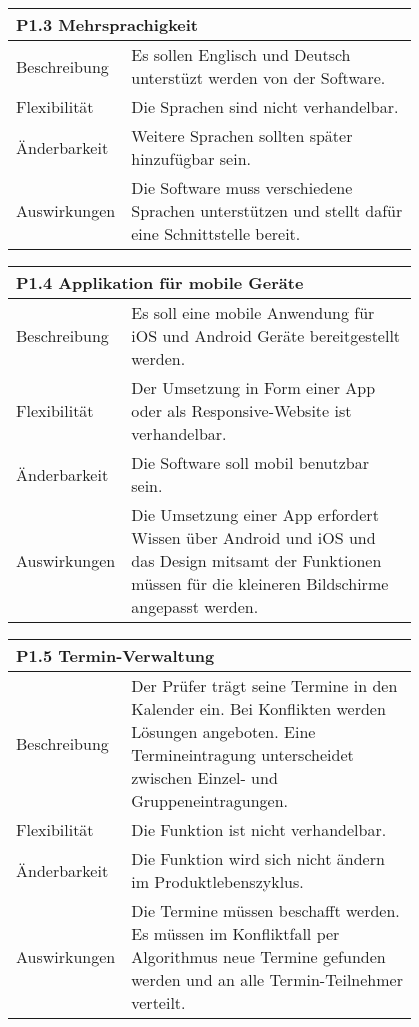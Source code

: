 {\centering
\begin{tabular}{|l|p{0.8\linewidth}|}
\hline
\multicolumn{2}{|l|}{\textbf{P1.3 Mehrsprachigkeit}}
  \tabularnewline \hline
Beschreibung                                               &  Es sollen Englisch und Deutsch unterstüzt werden von der Software. \tabularnewline \hline
Flexibilität                                              & Die Sprachen sind nicht verhandelbar.                                                                                \tabularnewline \hline
Änderbarkeit                                         & Weitere Sprachen sollten später hinzufügbar sein.                                                                 \tabularnewline \hline
Auswirkungen                                                & Die Software muss verschiedene Sprachen unterstützen und stellt dafür eine Schnittstelle bereit.                                         \tabularnewline \hline
 \hline
\end{tabular}



\centering
\begin{tabular}{|l|p{0.8\linewidth}|}
\hline
\multicolumn{2}{|l|}{\textbf{P1.4 Applikation für mobile Geräte}}
  \tabularnewline \hline
Beschreibung                                               &  Es soll eine mobile Anwendung für iOS und Android Geräte bereitgestellt werden. \tabularnewline \hline
Flexibilität                                              & Der Umsetzung in Form einer App oder als Responsive-Website ist verhandelbar.                                                                                \tabularnewline \hline
Änderbarkeit                                         & Die Software soll mobil benutzbar sein.                                                                 \tabularnewline \hline
Auswirkungen                                                & Die Umsetzung einer App erfordert Wissen über Android und iOS und das Design mitsamt der Funktionen müssen für die kleineren Bildschirme angepasst werden. \tabularnewline \hline
 \hline
\end{tabular}


\centering
\begin{tabular}{|l|p{0.8\linewidth}|}
\hline
\multicolumn{2}{|l|}{\textbf{P1.5 Termin-Verwaltung}}
  \tabularnewline \hline
Beschreibung                                               &  Der Prüfer trägt seine Termine in den Kalender ein. Bei Konflikten werden Lösungen angeboten. Eine Termineintragung unterscheidet zwischen Einzel- und Gruppeneintragungen.  \tabularnewline \hline
Flexibilität                                              & Die Funktion ist nicht verhandelbar. \tabularnewline \hline
Änderbarkeit                                         & Die Funktion wird sich nicht ändern im Produktlebenszyklus.                                                      \tabularnewline \hline
Auswirkungen                                                &  Die Termine müssen beschafft werden. Es müssen im Konfliktfall per Algorithmus neue Termine gefunden werden und an alle Termin-Teilnehmer verteilt.  \tabularnewline \hline
 \hline
\end{tabular}

}
